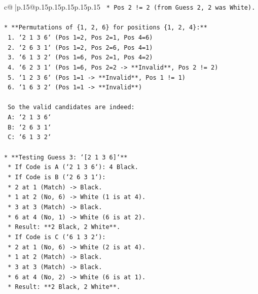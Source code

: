 \documentclass{article}
\begin{document}
{\begin{supertabular}{c@{$\;$}|p{.15\linewidth}@{}p{.15\linewidth}p{.15\linewidth}p{.15\linewidth}p{.15\linewidth}p{.15\linewidth}}
{{{\texttt{    *   Pos 2 != 2 (from Guess 2, 2 was White).} \\
\\ 
\texttt{*   **Permutations of \{1, 2, 6\} for positions \{1, 2, 4\}:**} \\
\texttt{    1.  `2 1 3 6` (Pos 1=2, Pos 2=1, Pos 4=6)} \\
\texttt{    2.  `2 6 3 1` (Pos 1=2, Pos 2=6, Pos 4=1)} \\
\texttt{    3.  `6 1 3 2` (Pos 1=6, Pos 2=1, Pos 4=2)} \\
\texttt{    4.  `6 2 3 1` (Pos 1=6, Pos 2=2 {-}> **Invalid**, Pos 2 != 2)} \\
\texttt{    5.  `1 2 3 6` (Pos 1=1 {-}> **Invalid**, Pos 1 != 1)} \\
\texttt{    6.  `1 6 3 2` (Pos 1=1 {-}> **Invalid**)} \\
\\ 
\texttt{    So the valid candidates are indeed:} \\
\texttt{    A: `2 1 3 6`} \\
\texttt{    B: `2 6 3 1`} \\
\texttt{    C: `6 1 3 2`} \\
\\ 
\texttt{*   **Testing Guess 3: `{[}2 1 3 6{]}`**} \\
\texttt{    *   If Code is A (`2 1 3 6`): 4 Black.} \\
\texttt{    *   If Code is B (`2 6 3 1`):} \\
\texttt{        *   2 at 1 (Match) {-}> Black.} \\
\texttt{        *   1 at 2 (No, 6) {-}> White (1 is at 4).} \\
\texttt{        *   3 at 3 (Match) {-}> Black.} \\
\texttt{        *   6 at 4 (No, 1) {-}> White (6 is at 2).} \\
\texttt{        *   Result: **2 Black, 2 White**.} \\
\texttt{    *   If Code is C (`6 1 3 2`):} \\
\texttt{        *   2 at 1 (No, 6) {-}> White (2 is at 4).} \\
\texttt{        *   1 at 2 (Match) {-}> Black.} \\
\texttt{        *   3 at 3 (Match) {-}> Black.} \\
\texttt{        *   6 at 4 (No, 2) {-}> White (6 is at 1).} \\
\texttt{        *   Result: **2 Black, 2 White**.} \\
\\ 
}}}
\end{supertabular}}
\end{document}
